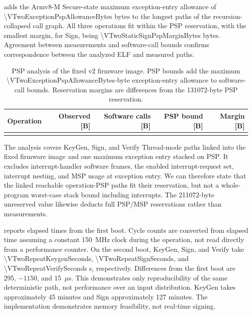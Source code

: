 \documentclass[a4paper,10pt]{article}
\theoremstyle{definition}
\theoremstyle{remark}
\begin{document}
 adds the Armv8-M Secure-state maximum exception-entry allowance of \num{\VTwoExceptionPspAllowanceBytes} bytes to the longest paths of the recursion-collapsed call graph. All three operations fit within the PSP reservation, with the smallest margin, for Sign, being \num{\VTwoStaticSignPspMarginBytes} bytes. Agreement between measurements and software-call bounds confirms correspondence between the analyzed ELF and measured paths.

\begin{table}[H]
  \centering
  \caption{PSP analysis of the fixed v2 firmware image. PSP bounds add the maximum \num{\VTwoExceptionPspAllowanceBytes}-byte exception-entry allowance to software-call bounds. Reservation margins are differences from the \num{131072}-byte PSP reservation.}
  \label{tab:v2-static-psp-bound}
  \small
  \begin{tabular}{@{}lrrrr@{}}
    \toprule
    Operation & Observed [B] & Software calls [B] & PSP bound [B] & Margin [B] \\
    \midrule
    \\
    \bottomrule
  \end{tabular}
\end{table}

The analysis covers KeyGen, Sign, and Verify Thread-mode paths linked into the fixed firmware image and one maximum exception entry stacked on PSP. It excludes interrupt-handler software frames, the enabled interrupt-request set, interrupt nesting, and MSP usage at exception entry. We can therefore state that the linked reachable operation-PSP paths fit their reservation, but not a whole-program worst-case stack bound including interrupts. The \num{211072}-byte unreserved value likewise deducts full PSP/MSP reservations rather than measurements.

 reports elapsed times from the first boot. Cycle counts are converted from elapsed time assuming a constant \SI{150}{\mega\hertz} clock during the operation, not read directly from a performance counter. On the second boot, KeyGen, Sign, and Verify take \num{\VTwoRepeatKeygenSeconds}, \num{\VTwoRepeatSignSeconds}, and \num{\VTwoRepeatVerifySeconds} s, respectively. Differences from the first boot are 295, $-1150$, and 15~$\mu$s. This demonstrates only reproducibility of the same deterministic path, not performance over an input distribution. KeyGen takes approximately 45 minutes and Sign approximately 127 minutes. The implementation demonstrates memory feasibility, not real-time signing.
\end{document}
